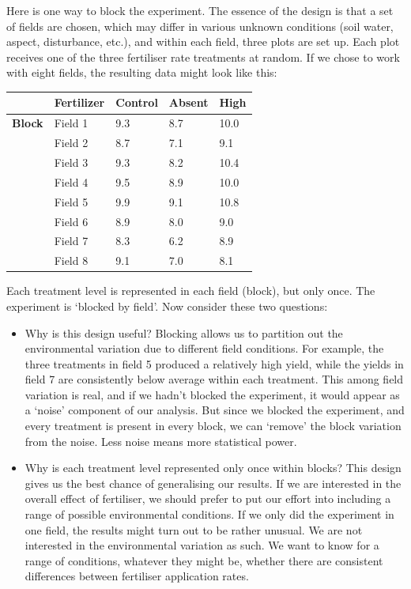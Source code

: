 \documentclass[
]{book}
\begin{document}
Here is one way to block the experiment. The essence of the design is that a set of fields are chosen, which may differ in various unknown conditions (soil water, aspect, disturbance, etc.), and within each field, three plots are set up. Each plot receives one of the three fertiliser rate treatments at random. If we chose to work with eight fields, the resulting data might look like this:

\begin{longtable}[]{@{}rllll@{}}
\toprule()
& \textbf{Fertilizer} & Control & Absent & High \\
\midrule()
\endhead
\textbf{Block} & Field 1 & 9.3 & 8.7 & 10.0 \\
& Field 2 & 8.7 & 7.1 & 9.1 \\
& Field 3 & 9.3 & 8.2 & 10.4 \\
& Field 4 & 9.5 & 8.9 & 10.0 \\
& Field 5 & 9.9 & 9.1 & 10.8 \\
& Field 6 & 8.9 & 8.0 & 9.0 \\
& Field 7 & 8.3 & 6.2 & 8.9 \\
& Field 8 & 9.1 & 7.0 & 8.1 \\
\bottomrule()
\end{longtable}

Each treatment level is represented in each field (block), but only once. The experiment is `blocked by field'. Now consider these two questions:

\begin{itemize}
\item
  Why is this design useful? Blocking allows us to partition out the environmental variation due to different field conditions. For example, the three treatments in field 5 produced a relatively high yield, while the yields in field 7 are consistently below average within each treatment. This among field variation is real, and if we hadn't blocked the experiment, it would appear as a `noise' component of our analysis. But since we blocked the experiment, and every treatment is present in every block, we can `remove' the block variation from the noise. Less noise means more statistical power.
\item
  Why is each treatment level represented only once within blocks? This design gives us the best chance of generalising our results. If we are interested in the overall effect of fertiliser, we should prefer to put our effort into including a range of possible environmental conditions. If we only did the experiment in one field, the results might turn out to be rather unusual. We are not interested in the environmental variation as such. We want to know for a range of conditions, whatever they might be, whether there are consistent differences between fertiliser application rates.
\end{itemize}
\end{document}
